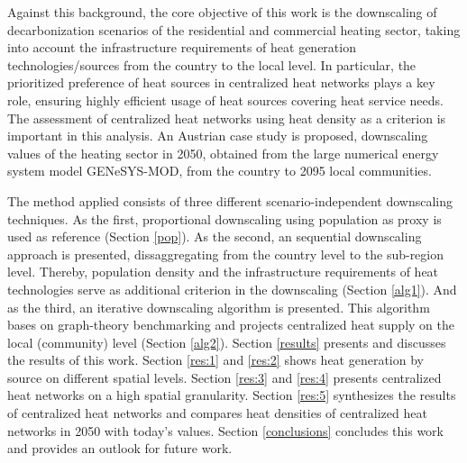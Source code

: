 Against this background, the core objective of this work is the downscaling of decarbonization scenarios of the residential and commercial heating sector, taking into account the infrastructure requirements of heat generation technologies/sources from the country to the local level. In particular, the prioritized preference of heat sources in centralized heat networks plays a key role, ensuring highly efficient usage of heat sources covering heat service needs. The assessment of centralized heat networks using heat density as a criterion is important in this analysis. An Austrian case study is proposed, downscaling values of the heating sector in 2050, obtained from the large numerical energy system model GENeSYS-MOD, from the country to 2095 local communities.\newline 

The method applied consists of three different scenario-independent downscaling techniques. As the first, proportional downscaling using population as proxy is used as reference (Section \ref{pop}). As the second, an sequential downscaling approach is presented, dissaggregating from the country level to the sub-region level. Thereby, population density and the infrastructure requirements of heat technologies serve as additional criterion in the downscaling (Section \ref{alg1}). And as the third, an iterative downscaling algorithm is presented. This algorithm bases on graph-theory benchmarking and projects centralized heat supply on the local (community) level (Section \ref{alg2}). Section \ref{results} presents and discusses the results of this work. Section \ref{res:1} and \ref{res:2} shows heat generation by source on different spatial levels. Section \ref{res:3} and \ref{res:4} presents centralized heat networks on a high spatial granularity. Section \ref{res:5} synthesizes the results of centralized heat networks and compares heat densities of centralized heat networks in 2050 with today's values. Section \ref{conclusions} concludes this work and provides an outlook for future work. 

